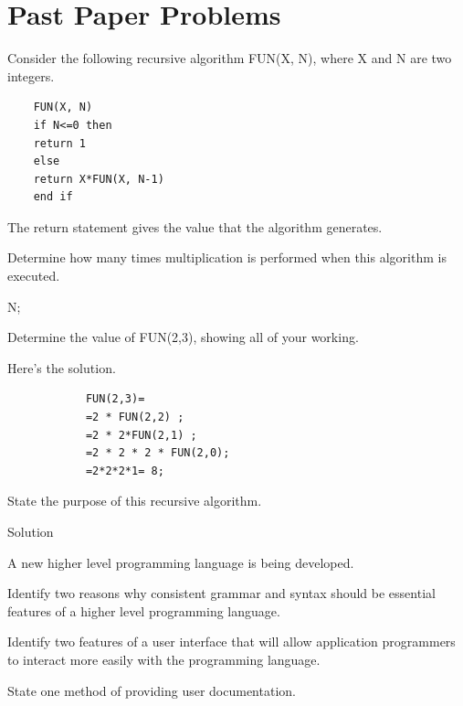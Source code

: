 \section{Past Paper Problems}
\begin{exercise*} %
Consider the following recursive algorithm FUN(X, N), where X and N are two integers.	
	\begin{verbatim}
	FUN(X, N)
	if N<=0 then
	return 1
	else
	return X*FUN(X, N-1)
	end if
	\end{verbatim}
	The return statement gives the value that the algorithm generates.
	
	\begin{parts}
		\item Determine how many times multiplication is performed when this algorithm is executed.
		\begin{solution}
			N;
		\end{solution}
		\item Determine the value of FUN(2,3), showing all of your working.
		\begin{solution}
			Here's the solution.
			\begin{verbatim}
			FUN(2,3)=
			=2 * FUN(2,2) ;
			=2 * 2*FUN(2,1) ;
			=2 * 2 * 2 * FUN(2,0);
			=2*2*2*1= 8;
			\end{verbatim}
		\end{solution}
		\item State the purpose of this recursive algorithm.
		\begin{solution}
			Solution
		\end{solution}
	\end{parts}
\end{exercise*}



\begin{exercise*}
A new higher level programming language is being developed.
\begin{parts}
\item Identify two reasons why consistent grammar and syntax should be essential features of a higher level programming language.
\item Identify two features of a user interface that will allow application programmers to interact more easily with the programming language.
\item State one method of providing user documentation.
\end{parts}
\end{exercise*}


